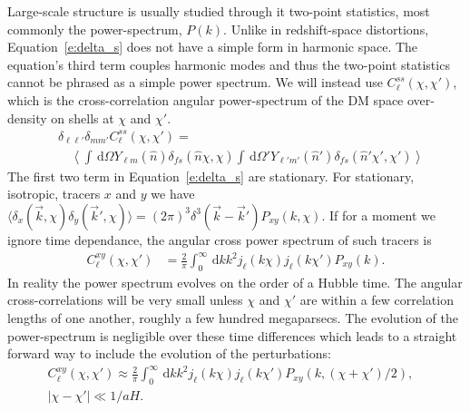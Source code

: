 \documentclass[twocolumn,prl,nofootinbib]{revtex4-1}
\newcommand{\ud}{\,\mathrm{d}}
\begin{document}
Large-scale structure is usually studied through it two-point statistics, most
commonly the power-spectrum, $P(k)$.
Unlike in redshift-space distortions, Equation~\ref{e:delta_s} does not have a
simple form in harmonic space. The equation's third term couples harmonic modes
and thus the two-point statistics cannot be phrased as a simple power spectrum.
We will instead use $C^{ss}_\ell(\chi,\chi')$, which is
the cross-correlation angular power-spectrum of the DM space over-density
on shells at $\chi$ and $\chi'$.
\begin{align}
    &\delta_{\ell\ell'}\delta_{mm'}C^{ss}_\ell(\chi, \chi') = \nonumber \\
    & \quad
        \left\langle
        \int\ud\Omega Y_{\ell m}(\hat n)
       \delta_{fs}(\hat n \chi, \chi)
        \int\ud\Omega' Y_{\ell' m'}(\hat n')
        \delta_{fs}(\hat n' \chi', \chi')
        \right\rangle
\end{align}
The first two term in Equation~\ref{e:delta_s} are stationary. For stationary,
isotropic, tracers $x$ and $y$ we have 
$\langle \delta_x(\vec k, \chi) \delta_y(\vec k', \chi) \rangle = (2\pi)^3
\delta^3(\vec k - \vec k') P_{xy}(k, \chi)$.  If for a moment we ignore time
dependance, the angular cross power spectrum of such tracers is
\begin{align}
    C^{xy}_\ell(\chi,\chi')
    &= \frac{2}{\pi}
\int_0^\infty\ud k k^2 j_\ell(k\chi) j_{\ell}(k\chi')P_{xy}(k).
\end{align}
In reality the power spectrum evolves on the order of a Hubble time.
The angular cross-correlations will be very small unless $\chi$ and $\chi'$ are
within a few correlation lengths of one another, roughly a few hundred
megaparsecs.  The evolution of the power-spectrum is negligible over these time
differences which leads to a straight forward way to include the evolution of
the perturbations:
\begin{align}
C^{xy}_\ell(\chi,\chi') 
    \approx \frac{2}{\pi}
    \int_0^\infty\ud k k^2
    j_\ell(k\chi) j_{\ell}(k\chi')
    P_{xy}(k,(\chi + \chi')/2),\nonumber &\\
    |\chi - \chi'| \ll 1/aH.&
\end{align}
\end{document}
